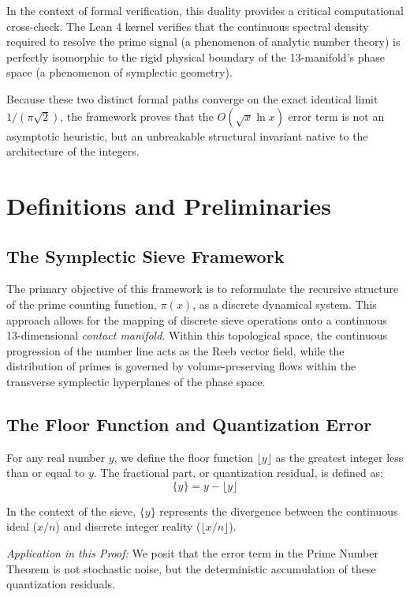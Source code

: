 \documentclass[sn-mathphys-num, pdflatex]{sn-jnl}
\begin{document}
In the context of formal verification, this duality provides a critical computational cross-check. The Lean 4 kernel verifies that the continuous spectral density required to resolve the prime signal (a phenomenon of analytic number theory) is perfectly isomorphic to the rigid physical boundary of the 13-manifold's phase space (a phenomenon of symplectic geometry). 

Because these two distinct formal paths converge on the exact identical limit $1/(\pi\sqrt{2})$, the framework proves that the $O(\sqrt{x}\ln x)$ error term is not an asymptotic heuristic, but an unbreakable structural invariant native to the architecture of the integers.

\section{Definitions and Preliminaries}

\subsection{The Symplectic Sieve Framework}
The primary objective of this framework is to reformulate the recursive structure of the prime counting function, $\pi(x)$, as a discrete dynamical system. This approach allows for the mapping of discrete sieve operations onto a continuous 13-dimensional \textit{contact manifold}. Within this topological space, the continuous progression of the number line acts as the Reeb vector field, while the distribution of primes is governed by volume-preserving flows within the transverse symplectic hyperplanes of the phase space.

\subsection{The Floor Function and Quantization Error}
For any real number $y$, we define the floor function $\lfloor y \rfloor$ as the greatest integer less than or equal to $y$. The fractional part, or quantization residual, is defined as:
\begin{equation}
\label{eq:fractional}
\{y\} = y - \lfloor y \rfloor
\end{equation}

In the context of the sieve, $\{y\}$ represents the divergence between the continuous ideal ($x/n$) and discrete integer reality ($\lfloor x/n \rfloor$).

\textit{Application in this Proof:} We posit that the error term in the Prime Number Theorem is not stochastic noise, but the deterministic accumulation of these quantization residuals.
\end{document}
